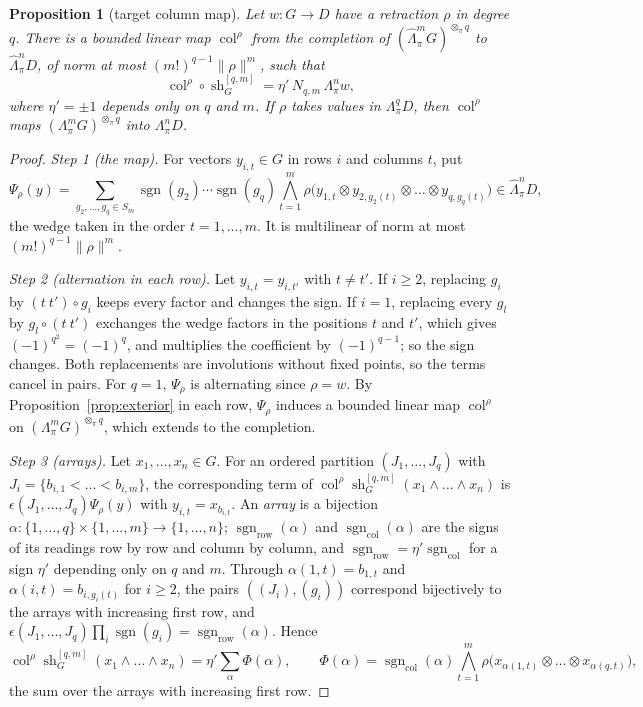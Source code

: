\documentclass[11pt]{amsart}
\newtheorem{proposition}[theorem]{Proposition}
\theoremstyle{definition}
\theoremstyle{remark}
\numberwithin{equation}{section}
\newcommand{\sgn}{\operatorname{sgn}}
\newcommand{\norm}[1]{\lVert #1\rVert}
\theoremstyle{plain}
\theoremstyle{definition}
\theoremstyle{plain}
\newcommand{\sh}{\operatorname{sh}}
\begin{document}
\begin{proposition}[target column map]\label{dgr:prop:r-column}
Let $w\colon G\to D$ have a retraction $\rho$ in degree $q$. There is a bounded linear map $\operatorname{col}^\rho$ from
the completion of $(\widehat\Lambda^m_\pi G)^{\otimes_\pi q}$ to $\widehat\Lambda^n_\pi D$, of norm at most
$(m!)^{q-1}\norm\rho^m$, such that
\[
 \operatorname{col}^\rho\circ\sh^{[q,m]}_G=\eta'\,N_{q,m}\,\Lambda^n_\pi w,
\]
where $\eta'=\pm1$ depends only on $q$ and $m$. If $\rho$ takes values in $\Lambda^q_\pi D$, then
$\operatorname{col}^\rho$ maps $(\Lambda^m_\pi G)^{\otimes_\pi q}$ into $\Lambda^n_\pi D$.
\end{proposition}

\begin{proof}
\emph{Step 1 (the map).} For vectors $y_{i,t}\in G$ in rows $i$ and columns $t$, put
\[
 \Psi_\rho(y)=\sum_{g_2,\dots,g_q\in S_m}\sgn(g_2)\cdots\sgn(g_q)\bigwedge_{t=1}^m
 \rho\bigl(y_{1,t}\otimes y_{2,g_2(t)}\otimes\dots\otimes y_{q,g_q(t)}\bigr)\in\widehat\Lambda^n_\pi D,
\]
the wedge taken in the order $t=1,\dots,m$. It is multilinear of norm at most $(m!)^{q-1}\norm\rho^m$.

\emph{Step 2 (alternation in each row).} Let $y_{i,t}=y_{i,t'}$ with $t\ne t'$. If $i\ge2$, replacing $g_i$ by
$(t\ t')\circ g_i$ keeps every factor and changes the sign. If $i=1$, replacing every $g_l$ by $g_l\circ(t\ t')$ exchanges
the wedge factors in the positions $t$ and $t'$, which gives $(-1)^{q^2}=(-1)^q$, and multiplies the coefficient by
$(-1)^{q-1}$; so the sign changes. Both replacements are involutions without fixed points, so the terms cancel in pairs.
For $q=1$, $\Psi_\rho$ is alternating since $\rho=w$. By Proposition~\ref{prop:exterior} in each row, $\Psi_\rho$ induces
a bounded linear map $\operatorname{col}^\rho$ on $(\Lambda^m_\pi G)^{\otimes_\pi q}$, which extends to the completion.

\emph{Step 3 (arrays).} Let $x_1,\dots,x_n\in G$. For an ordered partition $(J_1,\dots,J_q)$ with
$J_i=\{b_{i,1}<\dots<b_{i,m}\}$, the corresponding term of $\operatorname{col}^\rho\sh^{[q,m]}_G(x_1\wedge\dots\wedge x_n)$
is $\epsilon(J_1,\dots,J_q)\Psi_\rho(y)$ with $y_{i,t}=x_{b_{i,t}}$. An \emph{array} is a bijection
$\alpha\colon\{1,\dots,q\}\times\{1,\dots,m\}\to\{1,\dots,n\}$; $\sgn_{\mathrm{row}}(\alpha)$ and
$\sgn_{\mathrm{col}}(\alpha)$ are the signs of its readings row by row and column by column, and
$\sgn_{\mathrm{row}}=\eta'\sgn_{\mathrm{col}}$ for a sign $\eta'$ depending only on $q$ and $m$. Through
$\alpha(1,t)=b_{1,t}$ and $\alpha(i,t)=b_{i,g_i(t)}$ for $i\ge2$, the pairs $((J_i),(g_i))$ correspond bijectively to the
arrays with increasing first row, and $\epsilon(J_1,\dots,J_q)\prod_i\sgn(g_i)=\sgn_{\mathrm{row}}(\alpha)$. Hence
\[
 \operatorname{col}^\rho\sh^{[q,m]}_G(x_1\wedge\dots\wedge x_n)=\eta'\sum_\alpha\Phi(\alpha),\qquad
 \Phi(\alpha)=\sgn_{\mathrm{col}}(\alpha)\bigwedge_{t=1}^m\rho\bigl(x_{\alpha(1,t)}\otimes\dots\otimes x_{\alpha(q,t)}\bigr),
\]
the sum over the arrays with increasing first row.


\end{proof}
\end{document}
